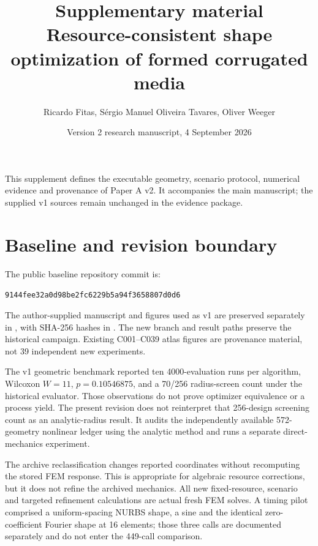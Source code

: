 \documentclass[11pt]{article}
\title{Supplementary material\\Resource-consistent shape optimization of formed corrugated media}
\author{Ricardo Fitas, S\'ergio Manuel Oliveira Tavares, Oliver Weeger}
\date{Version 2 research manuscript, 4 September 2026}
\begin{document}
\raggedbottom
\maketitle
\noindent This supplement defines the executable geometry, scenario protocol, numerical evidence and provenance of Paper A v2. It accompanies the main manuscript; the supplied v1 sources remain unchanged in the evidence package.

\section{Baseline and revision boundary}
The public baseline repository commit is:
\begin{center}\texttt{9144fee32a0d98be2fc6229b5a94f3658807d0d6}\end{center}
The author-supplied manuscript and figures used as v1 are preserved separately in , with SHA-256 hashes in . The new branch and result paths preserve the historical campaign. Existing C001--C039 atlas figures are provenance material, not 39 independent new experiments.

The v1 geometric benchmark reported ten 4000-evaluation runs per algorithm, Wilcoxon $W=11$, $p=0.10546875$, and a 70/256 radius-screen count under the historical evaluator. Those observations do not prove optimizer equivalence or a process yield. The present revision does not reinterpret that 256-design screening count as an analytic-radius result. It audits the independently available 572-geometry nonlinear ledger using the analytic method and runs a separate direct-mechanics experiment.

The archive reclassification changes reported coordinates without recomputing the stored FEM response. This is appropriate for algebraic resource corrections, but it does not refine the archived mechanics. All new fixed-resource, scenario and targeted refinement calculations are actual fresh FEM solves. A timing pilot comprised a uniform-spacing NURBS shape, a sine and the identical zero-coefficient Fourier shape at 16 elements; those three calls are documented separately and do not enter the 449-call comparison.
\end{document}
